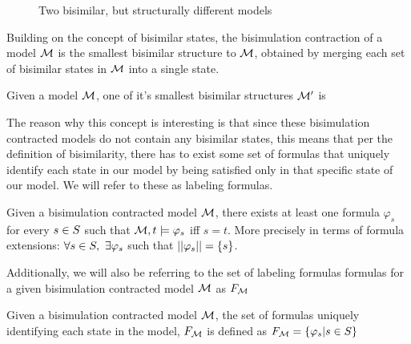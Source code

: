 \begin{figure}[h]
	\label{fig:bisimmods}
	\caption{Two bisimilar, but structurally different models}
	\centering
\end{figure}

Building on the concept of bisimilar states, the bisimulation contraction of a model $\mathcal{M}$ is the smallest bisimilar structure to $\mathcal{M}$, obtained by merging each set of bisimilar states in $\mathcal{M}$ into a single state. 

\begin{definition}
	\label{def:bisimContract}
	Given a model $\mathcal{M}$, one of it's smallest bisimilar structures $\mathcal{M}'$ is 
\end{definition}

The reason why this concept is interesting is that since these bisimulation contracted models do not contain any bisimilar states, this means that per the definition of bisimilarity, there has to exist some set of formulas that uniquely identify each state in our model by being satisfied only in that specific state of our model. We will refer to these as labeling formulas.

\begin{definition}
	\label{def:label}
	Given a bisimulation contracted model $\mathcal{M}$, there exists at least one formula $\varphi_s$ for every $s\in S$ such that $\mathcal{M},t \models \varphi_s$ iff $s = t$. More precisely in terms of formula extensions: 
	\centering
	$\forall s\in S,~\exists\varphi_s$ such that $||\varphi_s|| = \{s\}$.
\end{definition}

Additionally, we will also be referring to the set of labeling formulas formulas for a given bisimulation contracted model $\mathcal{M}$ as $F_{\mathcal{M}}$

\begin{definition}
	\label{def:labelSet}
	Given a bisimulation contracted model $\mathcal{M}$, the set of formulas uniquely identifying each state in the model, $F_{\mathcal{M}}$ is defined as $F_{\mathcal{M}} = \{\varphi_s | s \in S\}$
\end{definition}


